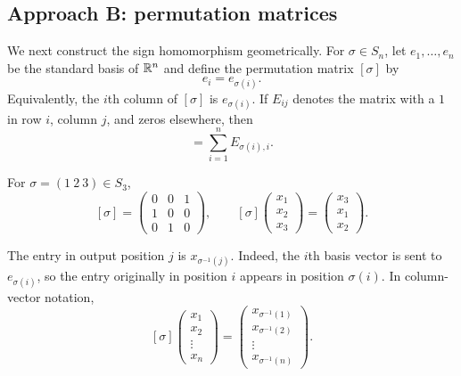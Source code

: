 \documentclass[reqno,11pt]{amsart}
\begin{document}
\subsection*{Approach B: permutation matrices}

We next construct the sign homomorphism geometrically. For
$\sigma\in S_n$, let $e_1,\dots,e_n$ be the standard basis of $\mathbb{R}^n$ and
define the permutation matrix $[\sigma]$ by
\begin{equation}
  [\sigma]e_i=e_{\sigma(i)}.
\end{equation}
Equivalently, the $i$th column of $[\sigma]$ is $e_{\sigma(i)}$.
If $E_{ij}$ denotes the matrix with a $1$ in row $i$, column $j$, and zeros
elsewhere, then
\begin{equation}
  [\sigma]=\sum_{i=1}^n E_{\sigma(i),i}.
\end{equation}

\begin{example}
For $\sigma=(1\ 2\ 3)\in S_3$,
\[
  [\sigma]=
  \begin{pmatrix}
		    0&0&1\\
		    1&0&0\\
		    0&1&0
		  \end{pmatrix},
  \qquad
  [\sigma]
  \begin{pmatrix}x_1\\x_2\\x_3\end{pmatrix}
  =
  \begin{pmatrix}x_3\\x_1\\x_2\end{pmatrix}.
\]

\end{example}

\begin{warningbox}
The entry in output position $j$ is $x_{\sigma^{-1}(j)}$.
Indeed, the $i$th basis vector is sent to $e_{\sigma(i)}$, so the entry
originally in position $i$ appears in position $\sigma(i)$.
In column-vector notation,
\[
  [\sigma]
  \begin{pmatrix}x_1\\x_2\\\vdots\\x_n\end{pmatrix}
  =
  \begin{pmatrix}
	    x_{\sigma^{-1}(1)}\\x_{\sigma^{-1}(2)}\\\vdots\\x_{\sigma^{-1}(n)}
	  \end{pmatrix}.
\]
\end{warningbox}
\end{document}
